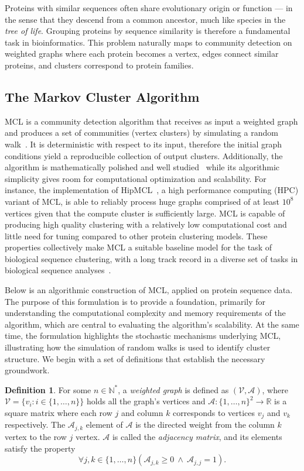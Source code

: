 Proteins with similar sequences often share evolutionary origin or function ---
in the sense that they descend from a common ancestor, much like species in the
\textit{tree of life}. Grouping proteins by sequence similarity is therefore a
fundamental task in bioinformatics. This problem naturally maps to community
detection on weighted graphs where each protein becomes a vertex, edges connect
similar proteins, and clusters correspond to protein families.

\subsection{The Markov Cluster Algorithm}
\label{subsec:mcl}

MCL is a community detection algorithm that receives as input a weighted graph
and produces a set of communities (vertex clusters) by simulating a random
walk~\cite{mcl}. It is deterministic with respect to its input, therefore the
initial graph conditions yield a reproducible collection of output clusters.
Additionally, the algorithm is mathematically polished and well
studied~\cite{mclDetailed} while its algorithmic simplicity gives room
for computational optimization and scalability. For instance, the
implementation of HipMCL~\cite{hipmcl}, a high performance computing (HPC)
variant of MCL, is able to reliably process huge graphs comprised of at
least \(10^8\) vertices given that the compute cluster is sufficiently large.
MCL is capable of producing high quality clustering with a relatively low
computational cost and little need for tuning compared to other protein
clustering models. These properties collectively make MCL a suitable baseline
model for the task of biological sequence clustering, with a long track record
in a diverse set of tasks in biological sequence analyses~\cite{mclBrohee,
mclVlasblom, mclHaue, mclGibbons}.

Below is an algorithmic construction of MCL, applied on protein sequence data.
The purpose of this formulation is to provide a foundation, primarily for
understanding the computational complexity and memory requirements of the
algorithm, which are central to evaluating the algorithm's scalability. At the
same time, the formulation highlights the stochastic mechanisms underlying MCL,
illustrating how the simulation of random walks is used to identify cluster
structure. We begin with a set of definitions that establish the necessary
groundwork.

\textbf{Definition 1}. For some \(n \in \mathbb{N}^*\), a \textit{weighted graph} is defined as \((\mathscr{V}, \mathcal{A})\), where \(\mathscr{V} = \{ v_i : i \in \{ 1, \dots, n \} \}\) holds all the graph's vertices and \(\mathcal{A}: \{ 1, \dots, n \}^2 \rightarrow \mathbb{R}\) is a square matrix where each row \(j\) and column \(k\) corresponds to vertices \(v_j\) and \(v_k\) respectively. The \(\mathcal{A}_{j,k}\) element of \(\mathcal{A}\) is the directed weight from the column \(k\) vertex to the row \(j\) vertex. \(\mathcal{A}\) is called the \textit{adjacency matrix}, and its elements satisfy the property
\[
  \forall j,k \in \{ 1, \dots, n \} \left( \mathcal{A}_{j, k} \geq 0 \ \wedge \ \mathcal{A}_{j, j} = 1 \right).
\]

